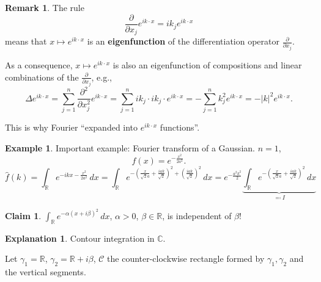 \documentclass[12pt]{article}
\theoremstyle{definition}
\newtheorem*{claim*}{Claim}
\newtheorem*{remark}{Remark}
\newtheorem{explanation}{Explanation}
\newtheorem*{example*}{Example}
\begin{document}
\begin{remark}
The rule
\[\frac\partial{\partial x_j}e^{ik\cdot x}=ik_je^{ik\cdot x}\]
means that $x\mapsto e^{ik\cdot x}$ is an \textbf{eigenfunction} of the differentiation operator $\frac\partial{\partial x_j}$.

As a consequence, $x\mapsto e^{ik\cdot x}$ is also an eigenfunction of compositions and linear combinations of the $\frac\partial{\partial x_j}$, e.g.,
\[\Delta e^{ik\cdot x}=\sum_{j=1}^n\frac{\partial^2}{\partial x_j^2}e^{ik\cdot x}=\sum_{j=1}^nik_j\cdot ik_j\cdot e^{ik\cdot x}=-\sum_{j=1}^nk_j^2e^{ik\cdot x}=-|k|^2e^{ik\cdot x}.\]

This is why Fourier ``expanded into $e^{ik\cdot x}$ functions''.
\end{remark}

\begin{example*}
Important example: Fourier transform of a Gaussian. $n=1$,
\[f(x)=e^{-\frac{x^2}{2a^2}}.\]
\[\hat f(k)=\int_\mathbb Re^{-ikx-\frac{x^2}{2a^2}}\,dx=\int_\mathbb Re^{-\left(\frac x{\sqrt2a}+\frac{iak}{\sqrt2}\right)^2+\left(\frac{iak}{\sqrt2}\right)^2}\,dx=e^{-\frac{a^2k^2}2}\underbrace{\int_\mathbb Re^{-\left(\frac x{\sqrt2a}+\frac{iak}{\sqrt2}\right)^2}\,dx}_{\eqqcolon I}\]

\begin{claim*}
$\int_\mathbb Re^{-\alpha(x+i\beta)^2}\,dx$, $\alpha>0$, $\beta\in\mathbb R$, is independent of $\beta$!
\end{claim*}

\begin{explanation}
Contour integration in $\mathbb C$.

\begin{center}
\end{center}

Let $\gamma_1=\mathbb R$, $\gamma_2=\mathbb R+i\beta$, $\mathcal C$ the counter-clockwise rectangle formed by $\gamma_1,\gamma_2$ and the vertical segments.


\end{explanation}
\end{example*}
\end{document}
